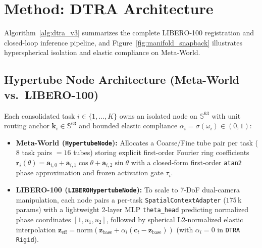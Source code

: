 \documentclass[10pt]{article}
\begin{document}
\section{Method: DTRA Architecture}
\label{sec:method}

Algorithm~\ref{alg:dtra_v3} summarizes the complete LIBERO-100 registration and closed-loop inference pipeline, and Figure~\ref{fig:manifold_snapback} illustrates hyperspherical isolation and elastic compliance on Meta-World.

\subsection{Hypertube Node Architecture (Meta-World vs.\ LIBERO-100)}
\label{sec:node_arch}
Each consolidated task $i \in \{1,\dots,K\}$ owns an isolated node on $\mathbb{S}^{63}$ with unit routing anchor $\mathbf{k}_i \in \mathbb{S}^{63}$ and bounded elastic compliance $\alpha_i = \sigma(\omega_i) \in (0,1)$:
\begin{itemize}[leftmargin=*,itemsep=1.5pt]
  \item \textbf{Meta-World (\texttt{HypertubeNode}):} Allocates a Coarse/Fine tube pair per task ($8$ task pairs $= 16$ tubes) storing explicit first-order Fourier ring coefficients $\mathbf{r}_i(\theta) = \mathbf{a}_{i,0} + \mathbf{a}_{i,1}\cos\theta + \mathbf{a}_{i,2}\sin\theta$ with a closed-form first-order \texttt{atan2} phase approximation and frozen activation gate $\tau_i$.
  \item \textbf{LIBERO-100 (\texttt{LIBEROHypertubeNode}):} To scale to 7-DoF dual-camera manipulation, each node pairs a per-task \texttt{SpatialContextAdapter} ($175\,$k params) with a lightweight 2-layer MLP \texttt{theta\_head} predicting normalized phase coordinates $[1, u_1, u_2]$, followed by spherical L2-normalized elastic interpolation $\mathbf{z}_{\text{eff}} = \mathrm{norm}(\mathbf{z}_{\text{base}} + \alpha_i(\mathbf{c}_t - \mathbf{z}_{\text{base}}))$ (with $\alpha_i=0$ in \texttt{DTRA Rigid}).
\end{itemize}
\end{document}
